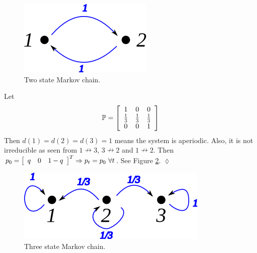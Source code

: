 \documentclass[lecture,12pt,]{pcms-l}
\begin{document}
\begin{figure}[ht!]
	\centering
	\includegraphics[width=.4\textwidth]{images/10mc2}
	\caption{Two state Markov chain.}
	\label{fig:10mc2}
\end{figure}

\begin{example}
Let
$$\mathbb{P} = \left[\begin{array}{c c c} 1 & 0 & 0 \\ \frac{1}{3} & \frac{1}{3} & \frac{1}{3} \\ 0 & 0 & 1 \end{array}\right]$$
Then $d(1)=d(2)=d(3)=1$ means the system is aperiodic. Also, it is not irreducible as seen from $1\nrightarrow 3$, $3\nrightarrow 2$ and $1\nrightarrow 2$. Then $p_0=\left[\begin{array}{c c c} q & 0 & 1-q \end{array}\right]^T \Rightarrow p_t=p_0 ~\forall t$. See Figure \ref{fig:10mc3a}.
$\lozenge$
\end{example}

\begin{figure}[ht!]
	\centering
	\includegraphics[width=.4\textwidth]{images/10mc3a}
	\caption{Three state Markov chain.}
	\label{fig:10mc3a}
\end{figure}
\end{document}
